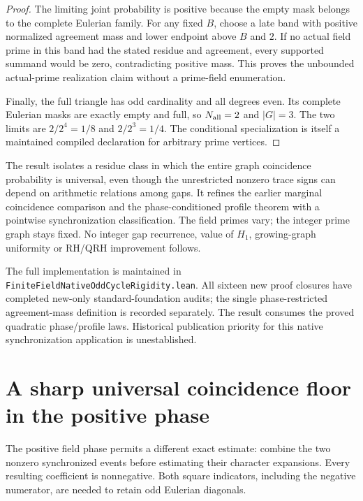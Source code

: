 \documentclass[11pt]{article}
\begin{document}
\begin{proof}
The limiting joint probability is positive because the empty mask
belongs to the complete Eulerian family.
For any fixed \(B\), choose a late band with positive normalized
agreement mass and lower endpoint above \(B\) and \(2\).
If no actual field prime in this band had the stated residue and
agreement, every supported summand would be zero, contradicting
positive mass. This proves the unbounded actual-prime realization
claim without a prime-field enumeration.

Finally, the full triangle has odd cardinality and all degrees even.
Its complete Eulerian masks are exactly empty and full, so
\(N_{\rm all}=2\) and \(|G|=3\).
The two limits are \(2/2^4=1/8\) and \(2/2^3=1/4\).
The conditional specialization is itself a maintained compiled
declaration for arbitrary prime vertices.
\end{proof}

The result isolates a residue class in which the entire graph
coincidence probability is universal, even though the unrestricted
nonzero trace signs can depend on arithmetic relations among gaps.
It refines the earlier marginal coincidence comparison and the
phase-conditioned profile theorem with a pointwise synchronization
classification. The field primes vary; the integer prime graph stays
fixed. No integer gap recurrence, value of \(H_1\), growing-graph
uniformity or RH/QRH improvement follows.

The full implementation is maintained in
\texttt{FiniteFieldNativeOddCycleRigidity.lean}.
All sixteen new proof closures have completed new-only
standard-foundation audits; the single phase-restricted agreement-mass
definition is recorded separately. The result consumes the proved
quadratic phase/profile laws. Historical publication priority for
this native synchronization application is unestablished.

\section{A sharp universal coincidence floor in the positive phase}
\label{sec:native-positive-phase-coincidence}

The positive field phase permits a different exact estimate: combine
the two nonzero synchronized events before estimating their character
expansions. Every resulting coefficient is nonnegative. Both square
indicators, including the negative numerator, are needed to retain
odd Eulerian diagonals.
\end{document}
